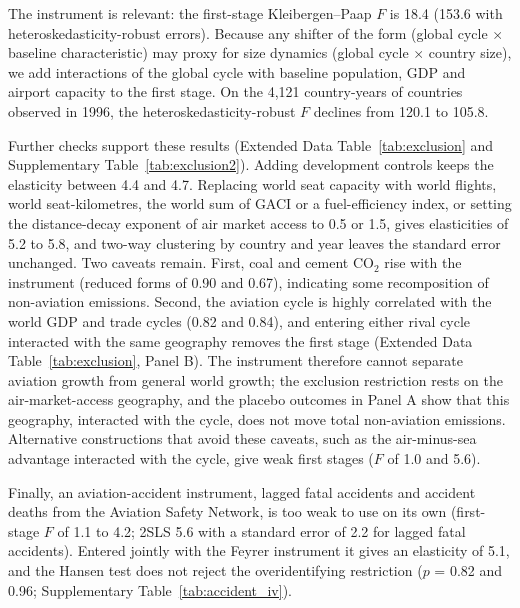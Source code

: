 The instrument is relevant: the first-stage Kleibergen--Paap $F$ is 18.4 (153.6 with heteroskedasticity-robust errors). Because any shifter of the form (global cycle $\times$ baseline characteristic) may proxy for size dynamics (global cycle $\times$ country size), we add interactions of the global cycle with baseline population, GDP and airport capacity to the first stage. On the 4,121 country-years of countries observed in 1996, the heteroskedasticity-robust $F$ declines from 120.1 to 105.8.


Further checks support these results (Extended Data Table~\ref{tab:exclusion} and Supplementary Table~\ref{tab:exclusion2}). Adding development controls keeps the elasticity between 4.4 and 4.7. Replacing world seat capacity with world flights, world seat-kilometres, the world sum of GACI or a fuel-efficiency index, or setting the distance-decay exponent of air market access to 0.5 or 1.5, gives elasticities of 5.2 to 5.8, and two-way clustering by country and year leaves the standard error unchanged. Two caveats remain. First, coal and cement CO$_2$ rise with the instrument (reduced forms of 0.90 and 0.67), indicating some recomposition of non-aviation emissions. Second, the aviation cycle is highly correlated with the world GDP and trade cycles (0.82 and 0.84), and entering either rival cycle interacted with the same geography removes the first stage (Extended Data Table~\ref{tab:exclusion}, Panel B). The instrument therefore cannot separate aviation growth from general world growth; the exclusion restriction rests on the air-market-access geography, and the placebo outcomes in Panel A show that this geography, interacted with the cycle, does not move total non-aviation emissions. Alternative constructions that avoid these caveats, such as the air-minus-sea advantage interacted with the cycle, give weak first stages ($F$ of 1.0 and 5.6).


Finally, an aviation-accident instrument, lagged fatal accidents and accident deaths from the Aviation Safety Network, is too weak to use on its own (first-stage $F$ of 1.1 to 4.2; 2SLS 5.6 with a standard error of 2.2 for lagged fatal accidents). Entered jointly with the Feyrer instrument it gives an elasticity of 5.1, and the Hansen test does not reject the overidentifying restriction ($p$ = 0.82 and 0.96; Supplementary Table~\ref{tab:accident_iv}).


